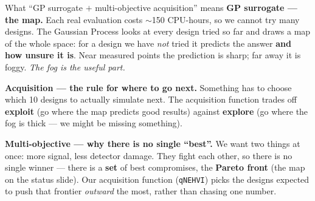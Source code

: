 \documentclass[aspectratio=169,10pt]{beamer}
\begin{document}
\begin{frame}{What ``GP surrogate $+$ multi-objective acquisition'' means}
\small
\textbf{GP surrogate --- the map.}
Each real evaluation costs $\sim$150 CPU-hours, so we cannot try many designs. The Gaussian
Process looks at every design tried so far and draws a map of the whole space: for a design we
have \emph{not} tried it predicts the answer \textbf{and how unsure it is}. Near measured points
the prediction is sharp; far away it is foggy. \emph{The fog is the useful part.}
\vspace{0.7em}

\textbf{Acquisition --- the rule for where to go next.}
Something has to choose which 10 designs to actually simulate next. The acquisition function
trades off \textbf{exploit} (go where the map predicts good results) against \textbf{explore}
(go where the fog is thick --- we might be missing something).
\vspace{0.7em}

\textbf{Multi-objective --- why there is no single ``best''.}
We want two things at once: more signal, less detector damage. They fight each other, so there
is no single winner --- there is a \textbf{set} of best compromises, the \textbf{Pareto front}
(the map on the status slide). Our acquisition function (\texttt{qNEHVI}) picks the designs
expected to push that frontier \emph{outward} the most, rather than chasing one number.
\end{frame}
\end{document}
